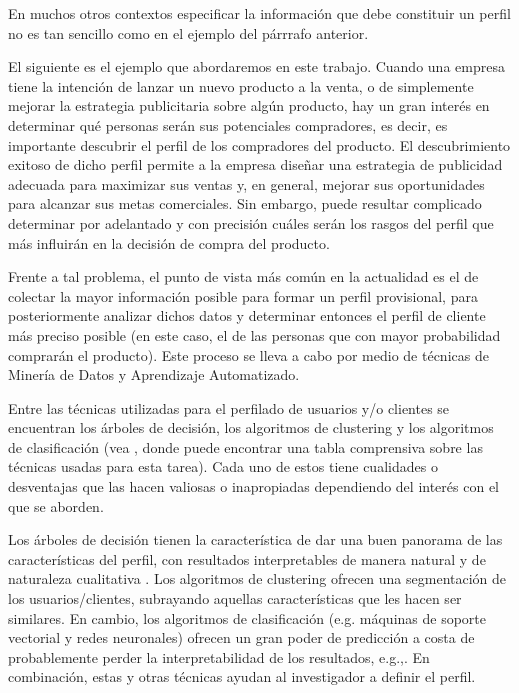 \documentclass[letterpaper,11pt]{article}
\begin{document}
\begin{multicols}{2}
En muchos otros contextos especificar la información que debe constituir un perfil no es tan sencillo como en
el ejemplo del párrrafo anterior. 


El siguiente es el ejemplo que abordaremos en este trabajo. Cuando una empresa tiene la intención de lanzar un nuevo
producto a la venta, o de simplemente mejorar la estrategia publicitaria sobre algún producto, 
hay un gran interés en determinar qué personas serán sus potenciales compradores, es decir, es importante descubrir el perfil de los compradores 
del producto. El descubrimiento exitoso de dicho perfil permite a la empresa diseñar una estrategia de publicidad adecuada
para maximizar sus ventas y, en general, mejorar sus oportunidades para alcanzar sus metas comerciales.  Sin embargo, puede resultar
complicado determinar por adelantado y con precisión cuáles serán los rasgos del perfil que más influirán en la decisión
de compra del producto. 

Frente a tal problema, el punto de vista más común en la actualidad es el de colectar la mayor información posible para
formar un perfil provisional, para posteriormente analizar dichos datos y determinar entonces el perfil de cliente más
preciso posible (en este caso, el de las personas que con mayor probabilidad comprarán el producto). Este proceso se
lleva a cabo por medio de técnicas de Minería de Datos y Aprendizaje Automatizado. 


Entre las técnicas utilizadas para el perfilado de usuarios y/o clientes se encuentran los árboles de decisión,
los algoritmos de clustering y los  algoritmos de clasificación (vea \cite{mah}, donde  puede encontrar una tabla
    comprensiva sobre las técnicas usadas para esta tarea). Cada uno de estos tiene cualidades o desventajas que las hacen valiosas o
inapropiadas dependiendo del interés con el que se aborden. 

Los árboles de decisión tienen la característica de dar una buen panorama de las características del perfil, con
resultados interpretables de manera natural y de naturaleza cualitativa \cite[Capítulo 6]{berry}. Los algoritmos de clustering ofrecen
una segmentación de los usuarios/clientes, subrayando aquellas características que les hacen ser similares. En cambio,
los algoritmos de clasificación (e.g. máquinas de soporte vectorial y redes neuronales) ofrecen un gran poder de
predicción a costa de probablemente perder la interpretabilidad de los resultados, e.g.,\cite{chen}. En combinación, estas y otras
técnicas ayudan al investigador a definir el perfil. 


\end{multicols}
\end{document}

